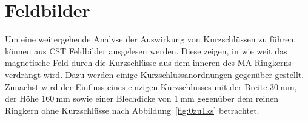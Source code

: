 \section{Feldbilder}
Um eine weitergehende Analyse der Auswirkung von Kurzschl\"ussen zu f\"uhren, k\"onnen aus CST Feldbilder ausgelesen werden. Diese zeigen, in wie weit das magnetische Feld durch die Kurzschl\"usse aus dem inneren des MA-Ringkerns verdr\"angt wird. Dazu werden einige Kurzschlussanordnungen gegen\"uber gestellt. Zun\"achst wird der Einfluss eines einzigen Kurzschlusses mit der Breite $\SI{30}{\milli\meter}$, der H\"ohe $\SI{160}{\milli\meter}$ sowie einer Blechdicke von $\SI{1}{\milli\meter}$ gegen\"uber dem reinen Ringkern ohne Kurzschl\"usse nach Abbildung~\ref{fig:0zu1ks} betrachtet.


\newpage



